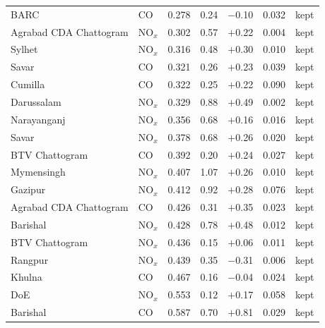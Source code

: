 \begin{longtable}{L{3.2cm} L{1.1cm} C{1.4cm} C{1.6cm} C{1.8cm} C{1.6cm} C{1.6cm}}
BARC & CO & 0.278 & 0.24 & $-$0.10 & 0.032 & kept \\
Agrabad CDA Chattogram & NO$_x$ & 0.302 & 0.57 & $+$0.22 & 0.004 & kept \\
Sylhet & NO$_x$ & 0.316 & 0.48 & $+$0.30 & 0.010 & kept \\
Savar & CO & 0.321 & 0.26 & $+$0.23 & 0.039 & kept \\
Cumilla & CO & 0.322 & 0.25 & $+$0.22 & 0.090 & kept \\
Darussalam & NO$_x$ & 0.329 & 0.88 & $+$0.49 & 0.002 & kept \\
Narayanganj & NO$_x$ & 0.356 & 0.68 & $+$0.16 & 0.016 & kept \\
Savar & NO$_x$ & 0.378 & 0.68 & $+$0.26 & 0.020 & kept \\
BTV Chattogram & CO & 0.392 & 0.20 & $+$0.24 & 0.027 & kept \\
Mymensingh & NO$_x$ & 0.407 & 1.07 & $+$0.26 & 0.010 & kept \\
Gazipur & NO$_x$ & 0.412 & 0.92 & $+$0.28 & 0.076 & kept \\
Agrabad CDA Chattogram & CO & 0.426 & 0.31 & $+$0.35 & 0.023 & kept \\
Barishal & NO$_x$ & 0.428 & 0.78 & $+$0.48 & 0.012 & kept \\
BTV Chattogram & NO$_x$ & 0.436 & 0.15 & $+$0.06 & 0.011 & kept \\
Rangpur & NO$_x$ & 0.439 & 0.35 & $-$0.31 & 0.006 & kept \\
Khulna & CO & 0.467 & 0.16 & $-$0.04 & 0.024 & kept \\
DoE & NO$_x$ & 0.553 & 0.12 & $+$0.17 & 0.058 & kept \\
Barishal & CO & 0.587 & 0.70 & $+$0.81 & 0.029 & kept \\
\end{longtable}
\endgroup
